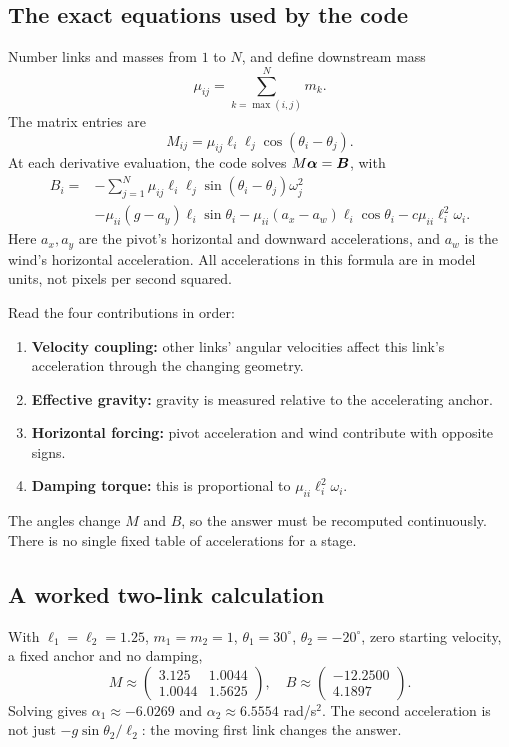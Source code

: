 \documentclass[11pt,a4paper]{article}
\begin{document}
\subsection{The exact equations used by the code}
Number links and masses from \(1\) to \(N\), and define downstream mass
\[
 \mu_{ij}=\sum_{k=\max(i,j)}^N m_k.
\]
The matrix entries are
\begin{equation}\label{eq:M}M_{ij}=\mu_{ij}\ell_i\ell_j\cos(\theta_i-\theta_j).\end{equation}
At each derivative evaluation, the code solves \(M\boldsymbol{\alpha}=\boldsymbol{B}\), with
\begin{align}\label{eq:B}
 B_i={}&-\sum_{j=1}^N\mu_{ij}\ell_i\ell_j\sin(\theta_i-\theta_j)\omega_j^2\nonumber\\
 &-\mu_{ii}(g-a_y)\ell_i\sin\theta_i
 -\mu_{ii}(a_x-a_w)\ell_i\cos\theta_i
 -c\mu_{ii}\ell_i^2\omega_i.
\end{align}
Here \(a_x,a_y\) are the pivot's horizontal and downward accelerations, and \(a_w\) is the wind's horizontal acceleration. All accelerations in this formula are in model units, not pixels per second squared.

Read the four contributions in order:
\begin{enumerate}
\item \textbf{Velocity coupling:} other links' angular velocities affect this link's acceleration through the changing geometry.
\item \textbf{Effective gravity:} gravity is measured relative to the accelerating anchor.
\item \textbf{Horizontal forcing:} pivot acceleration and wind contribute with opposite signs.
\item \textbf{Damping torque:} this is proportional to \(\mu_{ii}\ell_i^2\omega_i\).
\end{enumerate}
The angles change \(M\) and \(B\), so the answer must be recomputed continuously. There is no single fixed table of accelerations for a stage.
\subsection{A worked two-link calculation}
With \(\ell_1=\ell_2=1.25\), \(m_1=m_2=1\), \(\theta_1=30^\circ\), \(\theta_2=-20^\circ\), zero starting velocity, a fixed anchor and no damping,
\[
 M\approx\begin{pmatrix}3.125&1.0044\\1.0044&1.5625\end{pmatrix},\quad
 B\approx\begin{pmatrix}-12.2500\\4.1897\end{pmatrix}.
\]
Solving gives \(\alpha_1\approx-6.0269\) and \(\alpha_2\approx6.5554\) rad/s\(^2\). The second acceleration is not just \(-g\sin\theta_2/\ell_2\): the moving first link changes the answer.
\end{document}
